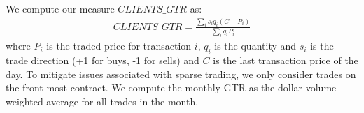 \documentclass[hidelinks, 11pt]{article}
\begin{document}
We compute our measure $CLIENTS\_GTR$ as:
\begin{align}
CLIENTS\_GTR = \frac{\sum_i s_i q_i (C - P_{i})}{\sum_{i} q_i P_i}
\end{align}
where $P_i$ is the traded price for transaction $i$, $q_i$ is the quantity and $s_i$ is the trade direction (+1 for buys, -1 for sells) and $C$ is the last transaction price of the day. To mitigate issues associated with sparse trading, we only consider trades on the front-most contract. We compute the monthly GTR as the dollar volume-weighted average for all trades in the month.







%
%
%

%
%
%
%
%
%
\fontsize{10}{12}\selectfont



\typeout{[Bibliography]}
%
%
%
%
%
%
%
%
%
%
%

\clearpage

\begin{table}[]
	\centering
	\caption{\textbf{Regression output}}
	\label{tab:RegResults}
	\begin{center}
		\resizebox{.95\textwidth}{!}{
			}
	\end{center}
\end{table}
\end{document}
